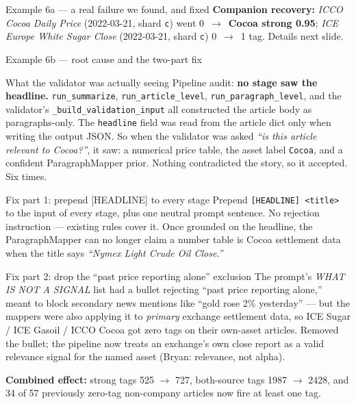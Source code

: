 \documentclass[10pt,aspectratio=169]{beamer}
\begin{document}
\begin{frame}[fragile]{Example 6a --- a real failure we found, and fixed}
  \vspace{0.2em}
  \textcolor{goodgreen}{\textbf{Companion recovery:}} \emph{ICCO Cocoa Daily Price} (2022-03-21,
  shard \texttt{c}) went 0~$\rightarrow$~\textbf{Cocoa strong 0.95}; \emph{ICE Europe White
  Sugar Close} (2022-03-21, shard \texttt{c}) 0~$\rightarrow$~1 tag. Details next slide.
\end{frame}

\begin{frame}{Example 6b --- root cause and the two-part fix}
  \scriptsize
  \begin{block}{What the validator was actually seeing}
    \scriptsize
    Pipeline audit: \textbf{no stage saw the headline.} \texttt{run\_summarize},
    \texttt{run\_article\_level}, \texttt{run\_paragraph\_level}, and the validator's
    \texttt{\_build\_validation\_input} all constructed the article body as paragraphs-only.
    The \texttt{headline} field was read from the article dict only when writing the output
    JSON. So when the validator was asked \emph{``is this article relevant to Cocoa?''}, it
    saw: a numerical price table, the asset label \texttt{Cocoa}, and a confident
    ParagraphMapper prior. Nothing contradicted the story, so it accepted. Six times.
  \end{block}

  \begin{block}{Fix part 1: prepend [HEADLINE] to every stage}
    \scriptsize
    Prepend \texttt{[HEADLINE] <title>} to the input of every stage, plus one neutral prompt
    sentence. No rejection instruction --- existing rules cover it. Once grounded on the
    headline, the ParagraphMapper can no longer claim a number table is Cocoa settlement
    data when the title says \emph{``Nymex Light Crude Oil Close.''}
  \end{block}

  \begin{block}{Fix part 2: drop the ``past price reporting alone'' exclusion}
    \scriptsize
    The prompt's \emph{WHAT IS NOT A SIGNAL} list had a bullet rejecting ``past price
    reporting alone,'' meant to block secondary news mentions like ``gold rose 2\% yesterday''
    --- but the mappers were also applying it to \emph{primary} exchange settlement data, so
    ICE Sugar / ICE Gasoil / ICCO Cocoa got zero tags on their own-asset articles. Removed the
    bullet; the pipeline now treats an exchange's own close report as a valid relevance
    signal for the named asset (Bryan: relevance, not alpha).
  \end{block}

  \textcolor{goodgreen}{\textbf{Combined effect:}} strong tags 525 $\rightarrow$ 727,
  both-source tags 1987 $\rightarrow$ 2428, and 34 of 57 previously zero-tag non-company
  articles now fire at least one tag.
\end{frame}
\end{document}
